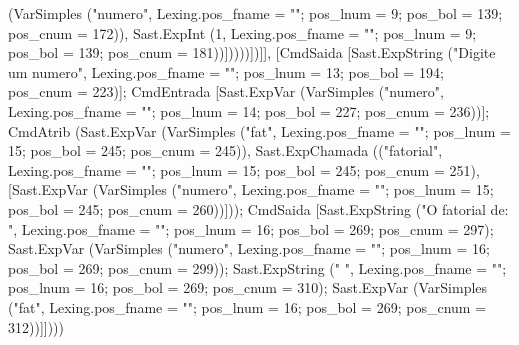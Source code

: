 \documentclass[12pt,a4paper,twoside]{article}
\begin{document}
\begin{terminal}
{                      (VarSimples
                        ("numero",
                         {Lexing.pos_fname = ""; pos_lnum = 9; pos_bol = 139;
                          pos_cnum = 172})),
                     Sast.ExpInt
                      (1,
                       {Lexing.pos_fname = ""; pos_lnum = 9; pos_bol = 139;
                        pos_cnum = 181}))]))))])]}],
     [CmdSaida
       [Sast.ExpString
         ("Digite um numero",
          {Lexing.pos_fname = ""; pos_lnum = 13; pos_bol = 194;
           pos_cnum = 223})];
      CmdEntrada
       [Sast.ExpVar
         (VarSimples
           ("numero",
            {Lexing.pos_fname = ""; pos_lnum = 14; pos_bol = 227;
             pos_cnum = 236}))];
      CmdAtrib
       (Sast.ExpVar
         (VarSimples
           ("fat",
            {Lexing.pos_fname = ""; pos_lnum = 15; pos_bol = 245;
             pos_cnum = 245})),
       Sast.ExpChamada
        (("fatorial",
          {Lexing.pos_fname = ""; pos_lnum = 15; pos_bol = 245;
           pos_cnum = 251}),
        [Sast.ExpVar
          (VarSimples
            ("numero",
             {Lexing.pos_fname = ""; pos_lnum = 15; pos_bol = 245;
              pos_cnum = 260}))]));
      CmdSaida
       [Sast.ExpString
         ("O fatorial de: ",
          {Lexing.pos_fname = ""; pos_lnum = 16; pos_bol = 269;
           pos_cnum = 297});
        Sast.ExpVar
         (VarSimples
           ("numero",
            {Lexing.pos_fname = ""; pos_lnum = 16; pos_bol = 269;
             pos_cnum = 299}));
        Sast.ExpString
         (" ",
          {Lexing.pos_fname = ""; pos_lnum = 16; pos_bol = 269;
           pos_cnum = 310});
        Sast.ExpVar
         (VarSimples
           ("fat",
            {Lexing.pos_fname = ""; pos_lnum = 16; pos_bol = 269;
             pos_cnum = 312}))]])))
             

\end{terminal}
\end{document}

